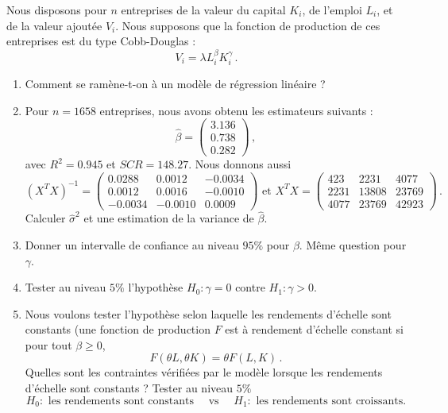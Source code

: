 \documentclass{../td_um}
\providecommand{\1}{\mathds{1}}
\begin{document}
	
	 Nous disposons pour $n$ entreprises de la valeur du capital $K_i$, de l'emploi $L_i$, et de la valeur ajoutée $V_i$. Nous supposons que la fonction de production de ces entreprises est du type Cobb-Douglas :
	\[
	V_i =\lambda L_i^\beta K_i^\gamma\,.
	\]
	\begin{enumerate}
		\item Comment se ramène-t-on à un modèle de régression linéaire ?
		\item Pour $n=1658$ entreprises, nous avons obtenu les estimateurs suivants :
		\[
		\hat \beta =
		\begin{pmatrix}
			3.136 \\
			0.738 \\
			0.282
		\end{pmatrix}\,,
		\]
		avec $R^2 = 0.945$ et $S C R = 148.27$. Nous donnons aussi
		\[
		(X^T X)^{-1} =
		\left(\begin{array}{ccc}
			0.0288 & 0.0012 & -0.0034 \\
			0.0012 & 0.0016 & -0.0010 \\
			-0.0034 & -0.0010 & 0.0009
		\end{array}\right)
		\text { et }
		X^T X =
		\left(\begin{array}{ccc}
			423 & 2231 & 4077 \\
			2231 & 13808 & 23769 \\
			4077 & 23769 & 42923
		\end{array}\right)\,.
		\]
		Calculer $\hat{\sigma}^{2}$ et une estimation de la variance de $\hat \beta$.
		\item Donner un intervalle de confiance au niveau $95 \%$ pour $\beta$. Même question pour $\gamma$.
		\item Tester au niveau $5 \%$ l'hypothèse $H_{0}: \gamma=0$ contre $H_{1}: \gamma>0$.
		\item Nous voulons tester l'hypothèse selon laquelle les rendements d'échelle sont constants (une fonction de production $F$ est à rendement d'échelle constant si pour tout $\beta \geq 0$,
		\[
		F(\theta L, \theta K)=\theta F(L, K)\,.
		\]
		Quelles sont les contraintes vérifiées par le modèle lorsque les rendements d'échelle sont constants ? Tester au niveau $5 \%$
		\[
		H_0 : \text{ les rendements sont constants} \quad \text{ vs } \quad H_1 : \text{ les rendements sont croissants.}
		\]
	\end{enumerate}
	
	
\end{document}
